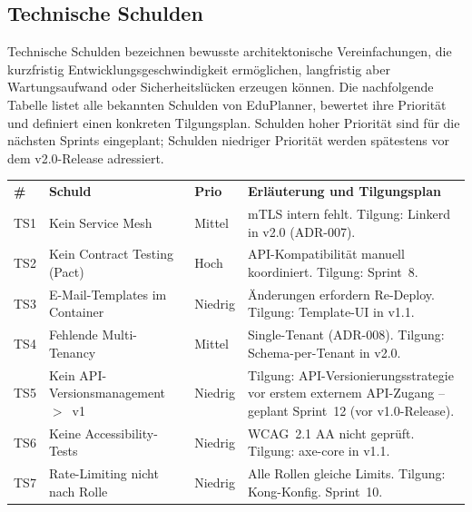 \subsection{Technische Schulden}

Technische Schulden bezeichnen bewusste architektonische Vereinfachungen, die kurzfristig Entwicklungsgeschwindigkeit ermöglichen, langfristig aber Wartungsaufwand oder Sicherheitslücken erzeugen können. Die nachfolgende Tabelle listet alle bekannten Schulden von EduPlanner, bewertet ihre Priorität und definiert einen konkreten Tilgungsplan. Schulden hoher Priorität sind für die nächsten Sprints eingeplant; Schulden niedriger Priorität werden spätestens vor dem v2.0-Release adressiert.

\begin{tabularx}{\textwidth}{C{0.5cm} L{3.5cm} C{1.8cm} X}
  \color{white}\textbf{\#} & \color{white}\textbf{Schuld} & \color{white}\textbf{Prio} & \color{white}\textbf{Erläuterung und Tilgungsplan} \\
  TS1 & Kein Service Mesh & Mittel & mTLS intern fehlt. Tilgung: Linkerd in v2.0 (ADR-007). \\
  TS2 & Kein Contract Testing (Pact) & Hoch & API-Kompatibilität manuell koordiniert. Tilgung: Sprint~8. \\
  TS3 & E-Mail-Templates im Container & Niedrig & Änderungen erfordern Re-Deploy. Tilgung: Template-UI in v1.1. \\
  TS4 & Fehlende Multi-Tenancy & Mittel & Single-Tenant (ADR-008). Tilgung: Schema-per-Tenant in v2.0. \\
  TS5 & Kein API-Versionsmanagement $>$~v1 & Niedrig & Tilgung: API-Versionierungsstrategie vor erstem externem API-Zugang -- geplant Sprint~12 (vor v1.0-Release). \\
  TS6 & Keine Accessibility-Tests & Niedrig & WCAG~2.1 AA nicht geprüft. Tilgung: axe-core in v1.1. \\
  TS7 & Rate-Limiting nicht nach Rolle & Niedrig & Alle Rollen gleiche Limits. Tilgung: Kong-Konfig. Sprint~10. \\
\end{tabularx}